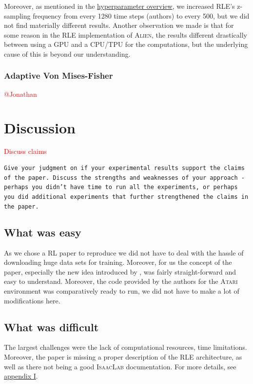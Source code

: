 \documentclass[10pt]{article} %
\begin{document}
\noindent Moreover, as mentioned in the \hyperlink{hyperparameter-subsection}{hyperparameter overview}, we increased RLE's z-sampling frequency from every 1280 time steps (authors) to every 500, but we did not find materially different results. Another observation we made is that for some reason in the RLE implementation of \textsc{Alien}, the results different drastically between using a GPU and a CPU/TPU for the computations, but the underlying cause of this is beyond our understanding.

\subsubsection{Adaptive Von Mises-Fisher}
\textcolor{red}{@Jonathan}


\section{Discussion}
\textcolor{red}{Discuss claims}


\texttt{Give your judgment on if your experimental results support the claims of the paper. Discuss the strengths and weaknesses of your approach - perhaps you didn't have time to run all the experiments, or perhaps you did additional experiments that further strengthened the claims in the paper.}

\subsection{What was easy}

\noindent As we chose a RL paper to reproduce we did not have to deal with the hassle of downloading huge data sets for training. Moreover, for us the concept of the paper, especially the new idea introduced by \cite{rle-paper}, was fairly straight-forward and easy to understand. Moreover, the code provided by the authors for the \textsc{Atari} environment was comparatively ready to run, we did not have to make a lot of modifications here.

\subsection{What was difficult}

\noindent The largest challenges were the lack of computational resources, time limitations. Moreover, the paper is missing a proper description of the RLE architecture, as well as there not being a good \textsc{IsaacLab} documentation. For more details, see \hyperlink{appendix-difficult}{appendix I}.
\end{document}
